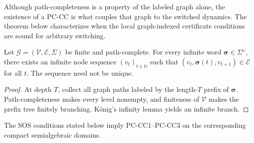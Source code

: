 
Although path-completeness is a property of the labeled graph alone, the existence of a PC-CC is what couples that graph to the switched dynamics. The theorem below characterizes when the local graph-indexed certificate conditions are sound for arbitrary switching.

\begin{lemma}\label{lem:path-lifting}
Let $\mathcal G=(\mathcal V,\mathcal E,\Sigma)$ be finite and path-complete. For every infinite word $\boldsymbol\sigma\in\Sigma^\omega$, there exists an infinite node sequence $(v_t)_{t\in\mathbb N}$ such that $(v_t,\boldsymbol\sigma(t),v_{t+1})\in\mathcal E$ for all $t$. The sequence need not be unique.
\end{lemma}
\begin{proof}
At depth $T$, collect all graph paths labeled by the length-$T$ prefix of $\boldsymbol\sigma$. Path-completeness makes every level nonempty, and finiteness of $\mathcal V$ makes the prefix tree finitely branching. K\"onig's infinity lemma yields an infinite branch.
\end{proof}

\begin{proposition}\label{prop:sos-pccc}
The SOS conditions stated below imply PC-CC1--PC-CC3 on the corresponding compact semialgebraic domains.
\end{proposition}

